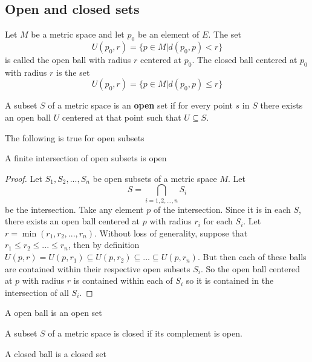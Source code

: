 \documentclass{article}
\begin{document}
\subsection{Open and closed sets}
\begin{definition}
    Let $M$ be a metric space and let $p_0$ be an element of $E$. The set
    \[
    U(p_0,r) = \{p\in M| d(p_0, p) < r\}
    \]
    is called the open ball with radius $r$ centered at $p_0$. The closed ball centered at $p_0$ 
    with radius $r$ is the set
    \[
    U(p_0,r) = \{p\in M| d(p_0, p) \leq r\}
    \]

\end{definition}

\begin{definition}
    A subset $S$ of a metric space is an \textbf{open} set if for every point $s$ in $S$ there exists an open ball $U$ centered at that point such that 
    $U\subseteq S$.
\end{definition}
The following is true for open subsets
\begin{theorem}
    A finite intersection of open subsets is open
\end{theorem}
\begin{proof}
    Let $S_1,S_2,...,S_n$ be open subsets of a metric space $M$. Let \[ S=\bigcap_{i=1,2,...,n}S_i\] be the intersection. Take any element $p$ of the intersection. 
    Since it is in each $S$, there exists an open ball centered at $p$ with radius $r_i$ for each $S_i$. Let $r=\min{(r_1,r_2,...,r_n)}$. Without loss of generality, suppose that
    $r_1 \leq r_2\leq...\leq r_n$, then by definition $U(p,r) =U(p,r_1) \subseteq U(p, r_2) \subseteq ... \subseteq U(p, r_n)$. But then each of these balls are contained within their respective open
    subsets $S_i$. So the open ball centered at $p$ with radius $r$ is contained within each of $S_i$ so it is contained in the intersection of all $S_i$.
\end{proof}
\begin{theorem}
    A open ball is an open set
\end{theorem}
\begin{definition}
    A subset $S$ of a metric space is closed if its complement is open.
\end{definition}
\begin{theorem}
    A closed ball is a closed set
\end{theorem}
\newpage
\end{document}
